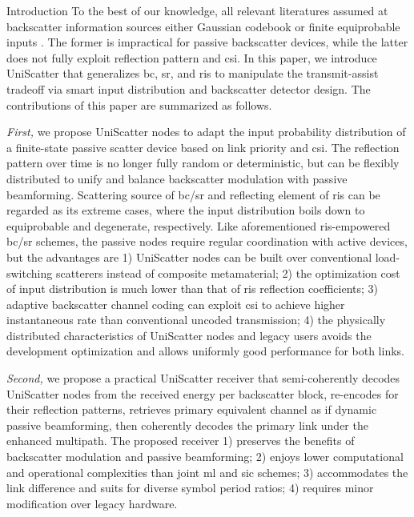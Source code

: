 \documentclass[journal]{IEEEtran}
\begin{document}
\begin{section}{Introduction}
	To the best of our knowledge, all relevant literatures assumed at backscatter information sources either Gaussian codebook \cite{Guo2019b,Ding2020,Long2020a,Zhou2019a,Wu2021a,Xu2021a,Yang2021a,Hu2021b} or finite equiprobable inputs \cite{Yang2018,Liang2020,Han2021,Zhang2022,Liu2019d,Bereyhi2020,Xu2020b,Zhang2021d,Hua2022,Basar2020,Ma2020a,Yuan2021,Hu2021a}.
	The former is impractical for passive backscatter devices, while the latter does not fully exploit reflection pattern and \gls{csi}.
	In this paper, we introduce UniScatter that generalizes \gls{bc}, \gls{sr}, and \gls{ris} to manipulate the transmit-assist tradeoff via smart input distribution and backscatter detector design.
	The contributions of this paper are summarized as follows.

	\emph{First,} we propose UniScatter nodes to adapt the input probability distribution of a finite-state passive scatter device based on link priority and \gls{csi}.
	The reflection pattern over time is no longer fully random or deterministic, but can be flexibly distributed to unify and balance backscatter modulation with passive beamforming.
	Scattering source of \gls{bc}/\gls{sr} and reflecting element of \gls{ris} can be regarded as its extreme cases, where the input distribution boils down to equiprobable and degenerate, respectively.
	Like aforementioned \gls{ris}-empowered \gls{bc}/\gls{sr} schemes, the passive nodes require regular coordination with active devices, but the advantages are 1) UniScatter nodes can be built over conventional load-switching scatterers instead of composite metamaterial; 2) the optimization cost of input distribution is much lower than that of \gls{ris} reflection coefficients; 3) adaptive backscatter channel coding can exploit \gls{csi} to achieve higher instantaneous rate than conventional uncoded transmission; 4) the physically distributed characteristics of UniScatter nodes and legacy users avoids the development optimization and allows uniformly good performance for both links.

	\emph{Second,} we propose a practical UniScatter receiver that semi-coherently decodes UniScatter nodes from the received energy per backscatter block, re-encodes for their reflection patterns, retrieves primary equivalent channel as if dynamic passive beamforming, then coherently decodes the primary link under the enhanced multipath.
	The proposed receiver 1) preserves the benefits of backscatter modulation and passive beamforming; 2) enjoys lower computational and operational complexities than joint \gls{ml} and \gls{sic} schemes; 3) accommodates the link difference and suits for diverse symbol period ratios; 4) requires minor modification over legacy hardware.


\end{section}
\end{document}
